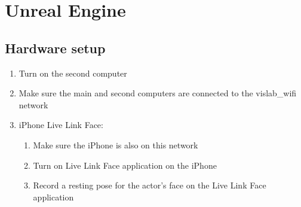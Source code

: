 \section{Unreal Engine}
\subsection{Hardware setup}
\begin{enumerate}
    \item Turn on the second computer
    \item Make sure the main and second computers are connected to the vislab\_wifi network
    \item iPhone Live Link Face:
    \begin{enumerate}
        \item Make sure the iPhone is also on this network
        \item Turn on Live Link Face application on the iPhone
        \item Record a resting pose for the actor's face on the Live Link Face application
    \end{enumerate}
\end{enumerate}
